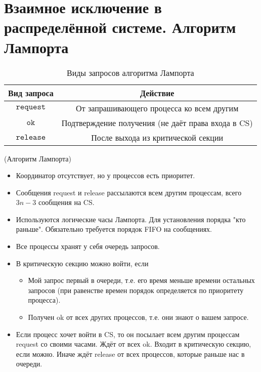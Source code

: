 \section{Взаимное исключение в распределённой системе. Алгоритм Лампорта}

\begin{table}[!ht]
    \centering
    \begin{tabular}{|c|c|} \hline
        Вид запроса & Действие \\ \hline
        $\texttt{request}$ & От запрашивающего процесса ко всем другим\\ \hline
        $\texttt{ok}$ & Подтверждение получения (не даёт права входа в CS) \\ \hline
        $\texttt{release}$ & После выхода из критической секции \\\hline
    \end{tabular}
    \caption{Виды запросов алгоритма Лампорта}
\end{table}

\begin{algorithm}(Алгоритм Лампорта)
\begin{itemize}
    \item Координатор отсутствует, но у процессов есть приоритет.
    \item Сообщения request и release рассылаются всем другим процессам, всего $3n-3$ сообщения на CS.
    \item Используются логические часы Лампорта.
        Для установления порядка "кто раньше".
        Обязательно требуется порядок FIFO на сообщениях.
    \item Все процессы хранят у себя очередь запросов.
    \item В критическую секцию можно войти, если
        \begin{itemize}
            \item Мой запрос первый в очереди, т.е. его время меньше времени 
                остальных запросов (при равенстве времен порядок определяется 
                по приоритету процесса).
            \item Получен ok от всех других процессов, т.е. они знают о вашем запросе.
        \end{itemize}
    \item Если процесс хочет войти в CS, то он посылает всем другим процессам request со
        своими часами. Ждёт от всех ok. Входит в критическую секцию, если можно.
        Иначе ждёт release от всех процессов, которые раньше нас в очереди.
\end{itemize}
\end{algorithm}

